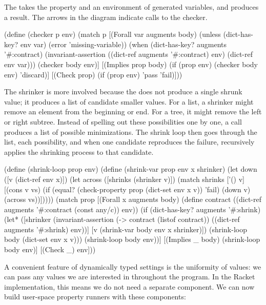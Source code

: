 The \checker{} takes the property and an environment of generated variables, and
produces a result. The  arrows in the diagram indicate calls to the
checker.

\begin{code}[language=Racket]
(define (checker p env)
  (match p
    [(Forall var augments body)
     (unless (dict-has-key? env var)
       (error 'missing-variable))
     (when (dict-has-key? augments '#:contract)
       (invariant-assertion ((dict-ref augments '#:contract) env) (dict-ref env var)))
     (checker body env)]
    [(Implies prop body)
     (if (prop env) (checker body env) 'discard)]
    [(Check prop)
     (if (prop env) 'pass 'fail)]))
\end{code}

The shrinker is more involved because the \shrinker{} does not produce a single shrunk
value; it produces a list of candidate smaller values. For a list, a shrinker might
remove an element from the beginning or end. For a tree, it might remove the left or
right subtree. Instead of spelling out these possibilities one by one, a
 call produces a list of possible minimizations. The shrink loop then
goes through the list,  each possibility, and when one candidate
reproduces the failure, recursively applies the shrinking process to that candidate.

\begin{code}[language=Racket]
(define (shrink-loop prop env)
  (define (shrink-var prop env x shrinker)
    (let down ([v (dict-ref env x)])
      (let across ([shrinks (shrinker v)])
        (match shrinks
          ['() v]
          [(cons v vs)
           (if (equal? (check-property prop (dict-set env x v)) 'fail)
               (down v)
               (across vs))]))))
  (match prop
    [(Forall x augments body)
     (define contract ((dict-ref augments '#:contract (const any/c)) env))
     (if (dict-has-key? augments '#:shrink)
         (let* ([shrinker (invariant-assertion
                           (-> contract (listof contract))
                           ((dict-ref augments '#:shrink) env))]
                [v (shrink-var body env x shrinker)])
           (shrink-loop body (dict-set env x v)))
         (shrink-loop body env))]
    [(Implies _ body) (shrink-loop body env)]
    [(Check _) env]))
\end{code}

A convenient feature of dynamically typed settings is the uniformity of values: we can
pass any values we are interested in throughout the program. In the Racket
implementation, this means we do not need a separate \printer{} component. We can now
build user-space property runners with these components:

